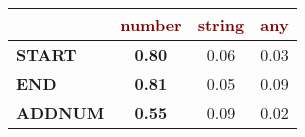 \renewcommand{\arraystretch}{0.5}
\scriptsize
\begin{tabular}{@{}l c@{\hskip 1mm} c@{\hskip 1mm} c@{}}
\toprule
& \textbf{\textcolor{Maroon}{number}} & \textbf{\textcolor{Maroon}{string}} & \textbf{\textcolor{Maroon}{any}}\\ 
\midrule
\textbf{\textcolor{mygreen}{START}} & \textbf{0.80} & 0.06 & 0.03\\
\textbf{\textcolor{mygreen}{END}} & \textbf{0.81} & 0.05 & 0.09\\
\textbf{\textcolor{mygreen}{ADDNUM}} & \textbf{0.55} & 0.09 & 0.02\\
\bottomrule
\end{tabular}